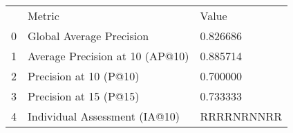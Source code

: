 \begin{tabular}{lll}
 & Metric & Value \\
0 & Global Average Precision & 0.826686 \\
1 & Average Precision at 10 (AP@10) & 0.885714 \\
2 & Precision at 10 (P@10) & 0.700000 \\
3 & Precision at 15 (P@15) & 0.733333 \\
4 & Individual Assessment (IA@10) & RRRRNRNNRR \\
\end{tabular}
